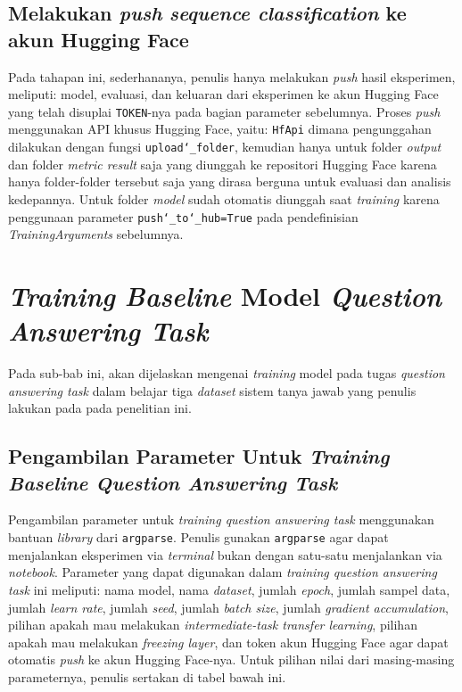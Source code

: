\subsection{Melakukan \emph{push} \emph{sequence classification} ke akun Hugging Face}
Pada tahapan ini, sederhananya, penulis hanya melakukan \emph{push} hasil eksperimen, meliputi: model, evaluasi, dan keluaran dari eksperimen ke akun Hugging Face yang telah disuplai \texttt{TOKEN}-nya pada bagian parameter sebelumnya. Proses \emph{push} menggunakan API khusus Hugging Face, yaitu: \texttt{HfApi} dimana pengunggahan dilakukan dengan fungsi \texttt{upload\char`_folder}, kemudian hanya untuk folder \emph{output} dan folder \emph{metric result} saja yang diunggah ke repositori Hugging Face karena hanya folder-folder tersebut saja yang dirasa berguna untuk evaluasi dan analisis kedepannya. Untuk folder \emph{model} sudah otomatis diunggah saat \emph{training} karena penggunaan parameter \texttt{push\char`_to\char`_hub=True} pada pendefinisian \emph{TrainingArguments} sebelumnya.

\section{\emph{Training} \emph{Baseline} Model \emph{Question Answering Task}}
Pada sub-bab ini, akan dijelaskan mengenai \emph{training} model pada tugas \emph{question answering task} dalam belajar tiga \emph{dataset} sistem tanya jawab yang penulis lakukan pada pada penelitian ini.

\subsection{Pengambilan Parameter Untuk \emph{Training Baseline Question Answering Task}}
Pengambilan parameter untuk \emph{training question answering task} menggunakan bantuan \emph{library} dari \texttt{argparse}. Penulis gunakan \texttt{argparse} agar dapat menjalankan eksperimen via \emph{terminal} bukan dengan satu-satu menjalankan via \emph{notebook}. Parameter yang dapat digunakan dalam \emph{training question answering task} ini meliputi: nama model, nama \emph{dataset}, jumlah \emph{epoch}, jumlah sampel data, jumlah \emph{learn rate}, jumlah \emph{seed}, jumlah \emph{batch size}, jumlah \emph{gradient accumulation}, pilihan apakah mau melakukan \emph{intermediate-task transfer learning}, pilihan apakah mau melakukan \emph{freezing layer}, dan token akun Hugging Face agar dapat otomatis \emph{push} ke akun Hugging Face-nya. Untuk pilihan nilai dari masing-masing parameternya, penulis sertakan di tabel bawah ini.

